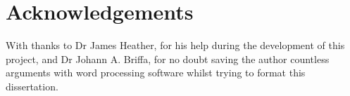 \chapter*{Acknowledgements}

With thanks to Dr James Heather, for his help during the development of this project, and Dr Johann A. Briffa, for no doubt saving the author countless arguments with word processing software whilst trying to format this dissertation.
